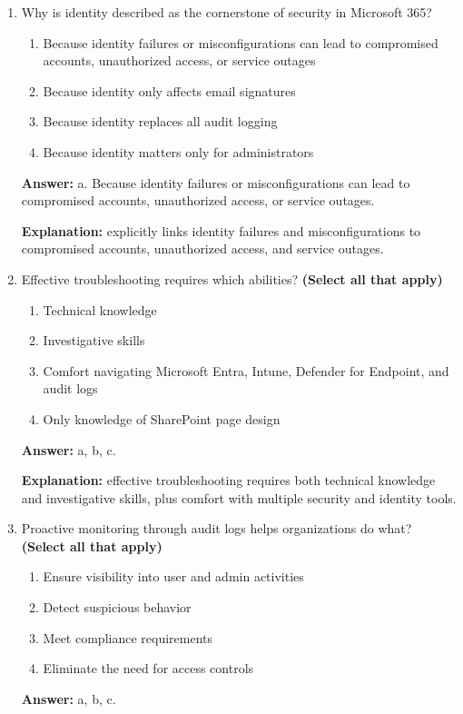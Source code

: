 \documentclass[10pt]{article}
\begin{document}
\begin{enumerate}[leftmargin=*]

\item Why is identity described as the cornerstone of security in Microsoft 365?
\begin{enumerate}[label=\alph*., leftmargin=1.5em]
\item Because identity failures or misconfigurations can lead to compromised accounts, unauthorized access, or service outages
\item Because identity only affects email signatures
\item Because identity replaces all audit logging
\item Because identity matters only for administrators
\end{enumerate}
\textbf{Answer:} a. Because identity failures or misconfigurations can lead to compromised accounts, unauthorized access, or service outages.

\textbf{Explanation:} explicitly links identity failures and misconfigurations to compromised accounts, unauthorized access, and service outages.

\item Effective troubleshooting requires which abilities? \textbf{(Select all that apply)}
\begin{enumerate}[label=\alph*., leftmargin=1.5em]
\item Technical knowledge
\item Investigative skills
\item Comfort navigating Microsoft Entra, Intune, Defender for Endpoint, and audit logs
\item Only knowledge of SharePoint page design
\end{enumerate}
\textbf{Answer:} a, b, c.

\textbf{Explanation:} effective troubleshooting requires both technical knowledge and investigative skills, plus comfort with multiple security and identity tools.

\item Proactive monitoring through audit logs helps organizations do what? \textbf{(Select all that apply)}
\begin{enumerate}[label=\alph*., leftmargin=1.5em]
\item Ensure visibility into user and admin activities
\item Detect suspicious behavior
\item Meet compliance requirements
\item Eliminate the need for access controls
\end{enumerate}
\textbf{Answer:} a, b, c.


\end{enumerate}
\end{document}
